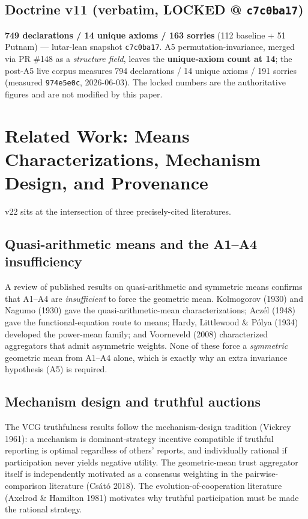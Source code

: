\documentclass[11pt]{article}
\theoremstyle{plain}
\theoremstyle{definition}
\theoremstyle{remark}
\begin{document}
\subsection{Doctrine v11 (verbatim, LOCKED @ \texttt{c7c0ba17})}
\textbf{749 declarations / 14 unique axioms / 163 sorries} (112 baseline + 51
Putnam) --- lutar-lean snapshot \texttt{c7c0ba17}. A5 permutation-invariance, merged
via PR \#148 as a \emph{structure field}, leaves the \textbf{unique-axiom count at
14}; the post-A5 live corpus measures 794 declarations / 14 unique axioms / 191
sorries (measured \texttt{974e5e0c}, 2026-06-03). The locked numbers are the
authoritative figures and are not modified by this paper.

\section{Related Work: Means Characterizations, Mechanism Design, and Provenance}

v22 sits at the intersection of three precisely-cited literatures.

\subsection{Quasi-arithmetic means and the A1--A4 insufficiency}
A review of published results on quasi-arithmetic and symmetric means confirms that
A1--A4 are \emph{insufficient} to force the geometric mean. Kolmogorov (1930) and
Nagumo (1930) gave the quasi-arithmetic-mean characterizations; Acz\'el (1948) gave
the functional-equation route to means; Hardy, Littlewood \& P\'olya (1934)
developed the power-mean family; and Voorneveld (2008) characterized aggregators
that admit asymmetric weights. None of these force a \emph{symmetric} geometric mean
from A1--A4 alone, which is exactly why an extra invariance hypothesis (A5) is
required.

\subsection{Mechanism design and truthful auctions}
The VCG truthfulness results follow the mechanism-design tradition (Vickrey 1961): a
mechanism is dominant-strategy incentive compatible if truthful reporting is optimal
regardless of others' reports, and individually rational if participation never
yields negative utility. The geometric-mean trust aggregator itself is independently
motivated as a consensus weighting in the pairwise-comparison literature (Cs\'at\'o
2018). The evolution-of-cooperation literature (Axelrod \& Hamilton 1981) motivates
why truthful participation must be made the rational strategy.
\end{document}

